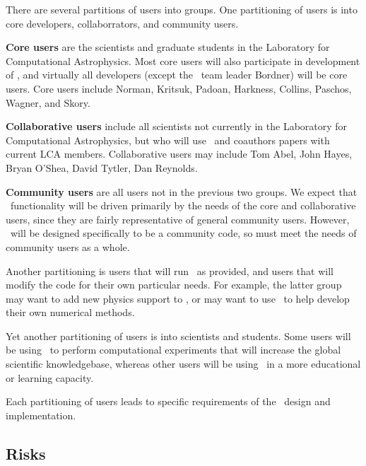 \documentclass[11pt]{article}
\begin{document}
    There are several partitions of users into groups.  One
    partitioning of users is into core developers, collaborrators, and
    community users.

    \textbf{Core users} are the scientists and graduate students in
    the Laboratory for Computational Astrophysics.  Most core users
    will also participate in development of \cello, and virtually all
    developers (except the \cello\ team leader Bordner) will be core
    users.  Core users include Norman, Kritsuk, Padoan, Harkness,
    Collins, Paschos, Wagner, and Skory.

    \textbf{Collaborative users} include all scientists not currently
    in the Laboratory for Computational Astrophysics, but who will use
    \cello\ and coauthors papers with current LCA members.
    Collaborative users may include Tom Abel, John Hayes, Bryan
    O'Shea, David Tytler, Dan Reynolds.

    \textbf{Community users} are all users not in the previous two
    groups.  We expect that \cello\ functionality will be driven
    primarily by the needs of the core and collaborative users, since
    they are fairly representative of general community users.
    However, \cello\ will be designed specifically to be a community
    code, so must meet the needs of community users as a whole.

    Another partitioning is users that will run \cello\ as provided,
    and users that will modify the code for their own particular
    needs.  For example, the latter group may want to add new physics
    support to \cello, or may want to use \cello\ to help develop
    their own numerical methods.

    Yet another partitioning of users is into scientists and students.
    Some users will be using \cello\ to perform computational
    experiments that will increase the global scientific knowledgebase,
    whereas other users will be using \cello\ in a more educational
    or learning capacity.

    Each partitioning of users leads to specific requirements of the
    \cello\ design and implementation.

\subsection{Risks}
\end{document}
